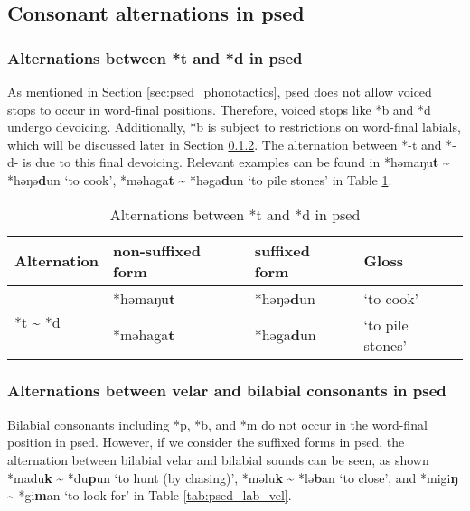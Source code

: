 \subsection{Consonant alternations in \acl{psed}}

\subsubsection{Alternations between *t and *d in \acl{psed}}  \label{sec:psed_d2t}

As mentioned in Section \ref{sec:psed_phonotactics}, \acl{psed} does not allow voiced stops to occur in word-final positions. Therefore, voiced stops like *b and *d undergo devoicing. Additionally, *b is subject to restrictions on word-final labials, which will be discussed later in Section \ref{sed:psed_lab_vel}. The alternation between *-t and *-d- is due to this final devoicing. Relevant examples can be found in *həmaŋu\textbf{t} \~{} *həŋə\textbf{d}un `to cook', *məhaga\textbf{t} \~{} *həga\textbf{d}un `to pile stones' in Table \ref{tab:psed_d2t}.

\begin{table}[!htbp]
\centering
\caption{Alternations between *t and *d in \acl{psed}}
\label{tab:psed_d2t}
\begin{tabular}{llll}
\hline
Alternation                   & non-suffixed form    & suffixed form & Gloss     \\ \hline
\multirow{2}{*}{*t \~{ } *d} & *həmaŋu\textbf{t} & *həŋə\textbf{d}un     & `to cook' \\
                              & *məhaga\textbf{t} & *həga\textbf{d}un     & `to pile stones'   \\ \hline
\end{tabular}
\end{table}

\subsubsection{Alternations between velar and bilabial consonants in \acl{psed}} \label{sed:psed_lab_vel}

Bilabial consonants including *p, *b, and *m do not occur in the word-final position in \acl{psed}. However, if we consider the suffixed forms in \acl{psed}, the alternation between bilabial velar and bilabial sounds can be seen, as shown *madu\textbf{k} \~{} *du\textbf{p}un `to hunt (by chasing)', *məlu\textbf{k} \~{} *lə\textbf{b}an `to close', and *migi\textbf{ŋ} \~{} *gi\textbf{m}an  `to look for' in Table \ref{tab:psed_lab_vel}.

